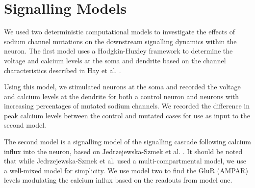 


\section{Signalling Models}
We used two deterministic computational models to investigate the effects of sodium channel
mutations on the downstream signalling dynamics within the neuron. The first model uses a
Hodgkin-Huxley framework to determine the voltage and calcium levels at the soma and dendrite based
on the channel characteristics described in Hay et al. \cite{hay2011models}.

Using this model, we stimulated neurons at the soma and recorded the voltage and calcium levels at
the dendrite for both a control neuron and neurons with increasing percentages of mutated sodium
channels. We recorded the difference in peak calcium levels between the control and mutated cases
for use as input to the second model.

The second model is a signalling model of the signalling cascade following calcium influx into the
neuron, based on Jedrzejewska-Szmek et al. \cite{jȩdrzejewska2017beta}. It should be noted that
while Jedrzejewska-Szmek et al. used a multi-compartmental model, we use a well-mixed model for
simplicity. We use model two to find the GluR (AMPAR) levels modulating the calcium influx based on
the readouts from model one.

